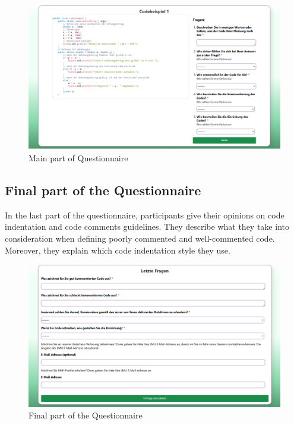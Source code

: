 \begin{figure} [H]
  \centering
  \includegraphics[scale=0.45]{figures/main_p.png}
  \caption{Main part of Questionnaire}
  \label{fig:AnhangsChor}
\end{figure}



\subsection{Final part of the Questionnaire}
In the last part of the questionnaire, participants give their opinions on code indentation and code comments guidelines. They describe what they take into consideration when defining poorly commented and well-commented code. Moreover, they explain which code indentation style they use.  


\begin{figure}  [H]
  \centering
  \includegraphics[scale=0.45]{figures/last_part.png}
  \caption{Final part of the Questionnaire}
  \label{fig:AnhangsChor}
\end{figure}


